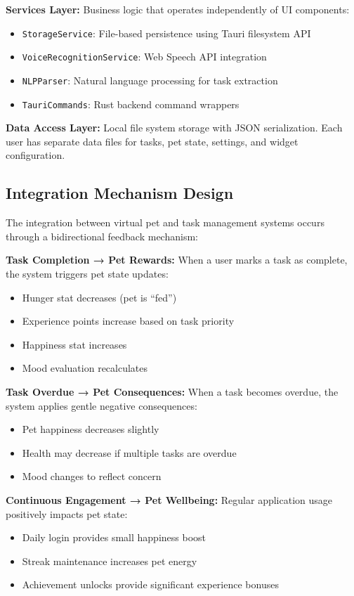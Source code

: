 \textbf{Services Layer:} Business logic that operates independently of UI components:
\begin{itemize}
    \item \texttt{StorageService}: File-based persistence using Tauri filesystem API
    \item \texttt{VoiceRecognitionService}: Web Speech API integration
    \item \texttt{NLPParser}: Natural language processing for task extraction
    \item \texttt{TauriCommands}: Rust backend command wrappers
\end{itemize}

\textbf{Data Access Layer:} Local file system storage with JSON serialization. Each user has separate data files for tasks, pet state, settings, and widget configuration.

\subsection{Integration Mechanism Design}

The integration between virtual pet and task management systems occurs through a bidirectional feedback mechanism:

\textbf{Task Completion → Pet Rewards:} When a user marks a task as complete, the system triggers pet state updates:
\begin{itemize}
    \item Hunger stat decreases (pet is ``fed'')
    \item Experience points increase based on task priority
    \item Happiness stat increases
    \item Mood evaluation recalculates
\end{itemize}

\textbf{Task Overdue → Pet Consequences:} When a task becomes overdue, the system applies gentle negative consequences:
\begin{itemize}
    \item Pet happiness decreases slightly
    \item Health may decrease if multiple tasks are overdue
    \item Mood changes to reflect concern
\end{itemize}

\textbf{Continuous Engagement → Pet Wellbeing:} Regular application usage positively impacts pet state:
\begin{itemize}
    \item Daily login provides small happiness boost
    \item Streak maintenance increases pet energy
    \item Achievement unlocks provide significant experience bonuses
\end{itemize}

